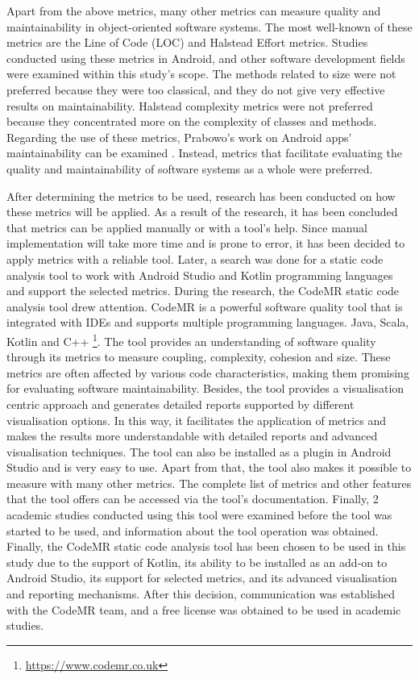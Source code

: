 Apart from the above metrics, many other metrics can measure quality and maintainability in object-oriented software systems. The most well-known of these metrics are the Line of Code (LOC) and Halstead Effort metrics. Studies conducted using these metrics in Android, and other software development fields were examined within this study's scope. The methods related to size were not preferred because they were too classical, and they do not give very effective results on maintainability. Halstead complexity metrics were not preferred because they concentrated more on the complexity of classes and methods. Regarding the use of these metrics, Prabowo's work on Android apps' maintainability can be examined \cite{19}. Instead, metrics that facilitate evaluating the quality and maintainability of software systems as a whole were preferred.

After determining the metrics to be used, research has been conducted on how these metrics will be applied. As a result of the research, it has been concluded that metrics can be applied manually or with a tool's help. Since manual implementation will take more time and is prone to error, it has been decided to apply metrics with a reliable tool. Later, a search was done for a static code analysis tool to work with Android Studio and Kotlin programming languages and support the selected metrics. During the research, the CodeMR static code analysis tool drew attention. CodeMR is a powerful software quality tool that is integrated with IDEs and supports multiple programming languages. Java, Scala, Kotlin and C++ \footnote{\url{https://www.codemr.co.uk}}. The tool provides an understanding of software quality through its metrics to measure coupling, complexity, cohesion and size. These metrics are often affected by various code characteristics, making them promising for evaluating software maintainability.  Besides, the tool provides a visualisation centric approach and generates detailed reports supported by different visualisation options. In this way, it facilitates the application of metrics and makes the results more understandable with detailed reports and advanced visualisation techniques. The tool can also be installed as a plugin in Android Studio and is very easy to use. Apart from that, the tool also makes it possible to measure with many other metrics. The complete list of metrics and other features that the tool offers can be accessed via the tool's documentation. Finally, 2 academic studies conducted using this tool were examined before the tool was started to be used, and information about the tool operation was obtained\cite{38}\cite{39}. Finally, the CodeMR static code analysis tool has been chosen to be used in this study due to the support of Kotlin, its ability to be installed as an add-on to Android Studio, its support for selected metrics, and its advanced visualisation and reporting mechanisms. After this decision, communication was established with the CodeMR team, and a free license was obtained to be used in academic studies. 

